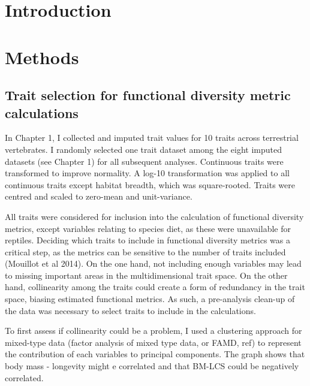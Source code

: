 \section{Introduction}
\section{Methods}
\subsection{Trait selection for functional diversity metric calculations}
In Chapter 1, I collected and imputed trait values for 10 traits across terrestrial vertebrates.
I randomly selected one trait dataset among the eight imputed datasets (see Chapter 1) for all subsequent analyses. Continuous traits were transformed to improve normality. A log-10 transformation was applied to all continuous traits except habitat breadth, which was square-rooted. Traits were centred and scaled to zero-mean and unit-variance.

All traits were considered for inclusion into the calculation of functional diversity metrics, except variables relating to species diet, as these were unavailable for reptiles. Deciding which traits to include in functional diversity metrics was a critical step, as the metrics can be sensitive to the number of traits included (Mouillot et al 2014). On the one hand, not including enough variables may lead to missing important areas in the multidimensional trait space. On the other hand, collinearity among the traits could create a form of redundancy in the trait space, biasing estimated functional metrics. As such, a pre-analysis clean-up of the data was necessary to select traits to include in the calculations.

To first assess if collinearity could be a problem, I used a clustering approach for mixed-type data (factor analysis of mixed type data, or FAMD, ref) to represent the contribution of each variables to principal components. The graph shows that body mass - longevity might e correlated and that BM-LCS could be negatively correlated.

